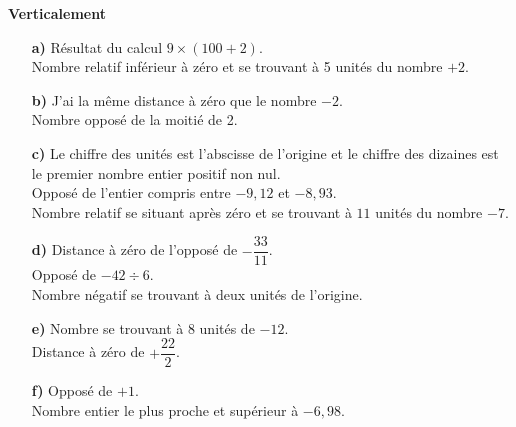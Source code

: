 \begin{enigme}
\begin{multicols}{2}
        {\bf Verticalement}         
        \begin{itemize}
            \item[\textcolor{B1}{\bf a)}] Résultat du calcul $9\times(100+2)$. \\
                Nombre relatif inférieur à zéro et se trouvant à 5 unités du nombre $+2$. \\
            \item[\textcolor{B1}{\bf b)}] J'ai la même distance à zéro que le nombre $-2$. \\
                Nombre opposé de la moitié de 2. \\
            \item[\textcolor{B1}{\bf c)}] Le chiffre des unités est l'abscisse de l'origine et le chiffre des dizaines est le premier nombre entier positif non nul. \\
                Opposé de l'entier compris entre $-9,12$ et $-8,93$. \\
                Nombre relatif se situant après zéro et se trouvant à $11$ unités du nombre $-7$. \\
            \item[\textcolor{B1}{\bf d)}] Distance à zéro de l'opposé de $-\dfrac{33}{11}$. \\ [1mm]
                Opposé de $-42\div6$. \\
                Nombre négatif se trouvant à deux unités de l'origine. \\
            \item[\textcolor{B1}{\bf e)}] Nombre se trouvant à 8 unités de $-12$. \\ [1mm]
                Distance à zéro de $+\dfrac{22}{2}$. \\
            \item[\textcolor{B1}{\bf f)}] Opposé de $+1$. \\
                Nombre entier le plus proche et supérieur à $-6,98$.
        \end{itemize}
    \end{multicols}
 \end{enigme}
 

